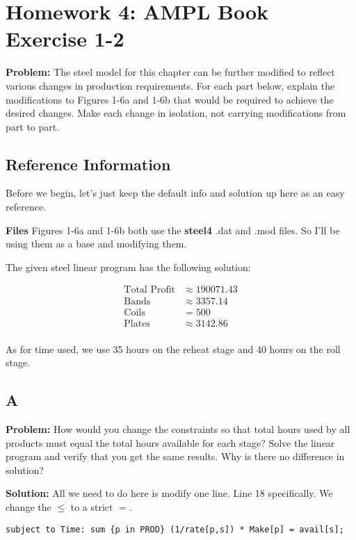 \section*{Homework 4: AMPL Book Exercise 1-2}

\textbf{Problem:} The steel model for this chapter can be further modified to reflect various changes in production requirements. For each part below, explain the modifications to Figures 1-6a and 1-6b that would be required to achieve the desired changes. Make each change in isolation, not carrying modifications from part to part. 

\subsection*{Reference Information}

Before we begin, let's just keep the default info and solution up here as an easy reference. 

\textbf{Files} Figures 1-6a and 1-6b both use the \textbf{steel4} .dat and .mod files. So I'll be using them as a base and modifying them. 

The given steel linear program has the following solution:

\begin{align*}
	\text{Total Profit} &\approx 190071.43 \\
	\text{Bands} &\approx 3357.14 \\
	\text{Coils} &= 500 \\
	\text{Plates} &\approx 3142.86 \\
\end{align*}

As for time used, we use 35 hours on the reheat stage and 40 hours on the roll stage.

\subsection*{A}

\textbf{Problem:} How would you change the constraints so that total hours used by all products must equal the total hours available for each stage? Solve the linear program and verify that you get the same results. Why is there no difference in solution?

\noindent\textbf{Solution:} All we need to do here is modify one line. Line 18 specifically. We change the $\leq$ to a strict $=$. 

\begin{lstlisting}
subject to Time: sum {p in PROD} (1/rate[p,s]) * Make[p] = avail[s];
\end{lstlisting}

